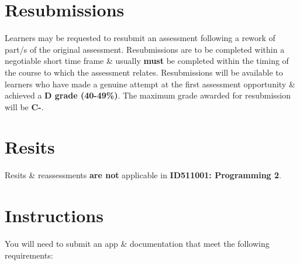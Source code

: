 \documentclass{article}
\begin{document}
\section*{Resubmissions}
Learners may be requested to resubmit an assessment following a rework of part/s of the original assessment. Resubmissions are to be completed within a negotiable short time frame \& usually \textbf{must} be completed within the timing of the course to which the assessment relates. Resubmissions will be available to learners who have made a genuine attempt at the first assessment opportunity \& achieved a \textbf{D grade (40-49\%)}. The maximum grade awarded for resubmission will be \textbf{C-}.

\section*{Resits}
Resits \& reassessments \textbf{are not} applicable in \textbf{ID511001: Programming 2}.

\section*{Instructions}
You will need to submit an app \& documentation that meet the following requirements:\\
\end{document}
